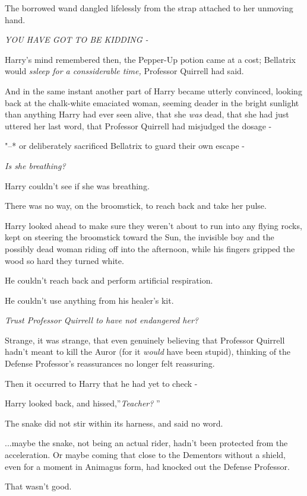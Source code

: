 The borrowed wand dangled lifelessly from the strap attached to her
unmoving hand.

\emph{YOU HAVE GOT TO BE KIDDING -}

Harry's mind remembered then, the Pepper-Up potion came at a cost;
Bellatrix would \emph{ssleep for a conssiderable time,} Professor
Quirrell had said.

And in the same instant another part of Harry became utterly convinced,
looking back at the chalk-white emaciated woman, seeming deader in the
bright sunlight than anything Harry had ever seen alive, that she
\emph{was} dead, that she had just uttered her last word, that Professor
Quirrell had misjudged the dosage -

"--* or deliberately sacrificed Bellatrix to guard their own escape -

\emph{Is she breathing?}

Harry couldn't see if she was breathing.

There was no way, on the broomstick, to reach back and take her pulse.

Harry looked ahead to make sure they weren't about to run into any
flying rocks, kept on steering the broomstick toward the Sun, the
invisible boy and the possibly dead woman riding off into the afternoon,
while his fingers gripped the wood so hard they turned white.

He couldn't reach back and perform artificial respiration.

He couldn't use anything from his healer's kit.

\emph{Trust Professor Quirrell to have not endangered her?}

Strange, it was strange, that even genuinely believing that Professor
Quirrell hadn't meant to kill the Auror (for it \emph{would} have been
stupid), thinking of the Defense Professor's reassurances no longer felt
reassuring.

Then it occurred to Harry that he had yet to check -

Harry looked back, and hissed,''\emph{Teacher?} ''

The snake did not stir within its harness, and said no word.

...maybe the snake, not being an actual rider, hadn't been
protected from the acceleration. Or maybe coming that close to the
Dementors without a shield, even for a moment in Animagus form, had
knocked out the Defense Professor.

That wasn't good.

